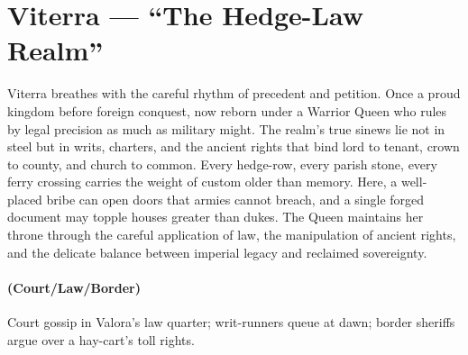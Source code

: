 \section{Viterra --- ``The Hedge-Law Realm''}
\label{chap:viterra}

\begin{tcolorbox}[colback=black!3,colframe=black!40!white,title={Theme \& Atmosphere}]
Viterra breathes with the careful rhythm of precedent and petition. Once a proud kingdom before foreign conquest, now reborn under a Warrior Queen who rules by legal precision as much as military might. The realm's true sinews lie not in steel but in writs, charters, and the ancient rights that bind lord to tenant, crown to county, and church to common. Every hedge-row, every parish stone, every ferry crossing carries the weight of custom older than memory. Here, a well-placed bribe can open doors that armies cannot breach, and a single forged document may topple houses greater than dukes. The Queen maintains her throne through the careful application of law, the manipulation of ancient rights, and the delicate balance between imperial legacy and reclaimed sovereignty.
\end{tcolorbox}

\paragraph*{(Court/Law/Border)} Court gossip in Valora's law quarter; writ-runners queue at dawn; border sheriffs argue over a hay-cart's toll rights.

